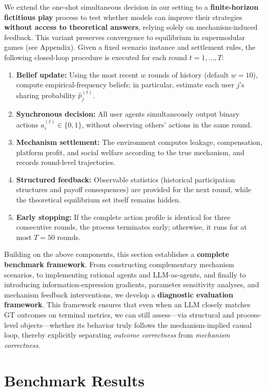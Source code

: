 \documentclass[sigconf,anonymous,review]{acmart}
\theoremstyle{definition}
\begin{document}
We extend the one-shot simultaneous decision in our setting to a \textbf{finite-horizon fictitious play} process to test whether models can improve their strategies \textbf{without access to theoretical answers}, relying solely on mechanism-induced feedback.
This variant preserves convergence to equilibrium in supermodular games (see Appendix).
Given a fixed scenario instance and settlement rules, the following closed-loop procedure is executed for each round $t=1,\ldots,T$:
\begin{enumerate}
  \item \textbf{Belief update:} Using the most recent $w$ rounds of history (default $w=10$), compute empirical-frequency beliefs; in particular, estimate each user $j$’s sharing probability $\hat{p}^{(t)}_j$.
  \item \textbf{Synchronous decision:} All user agents simultaneously output binary actions $a_i^{(t)}\in\{0,1\}$, without observing others’ actions in the same round.
  \item \textbf{Mechanism settlement:} The environment computes leakage, compensation, platform profit, and social welfare according to the true mechanism, and records round-level trajectories.
  \item \textbf{Structured feedback:} Observable statistics (historical participation structures and payoff consequences) are provided for the next round, while the theoretical equilibrium set itself remains hidden.
  \item \textbf{Early stopping:} If the complete action profile is identical for three consecutive rounds, the process terminates early; otherwise, it runs for at most $T=50$ rounds.
\end{enumerate}

Building on the above components, this section establishes a \textbf{complete benchmark framework}.
From constructing complementary mechanism scenarios, to implementing rational agents and LLM-as-agents, and finally to introducing information-expression gradients, parameter sensitivity analyses, and mechanism feedback interventions, we develop a \textbf{diagnostic evaluation framework}.
This framework ensures that even when an LLM closely matches GT outcomes on terminal metrics, we can still assess—via structural and process-level objects—whether its behavior truly follows the mechanism-implied causal loop, thereby explicitly separating \emph{outcome correctness} from \emph{mechanism correctness}.


\section{Benchmark Results}
\label{sec:results}
\end{document}
